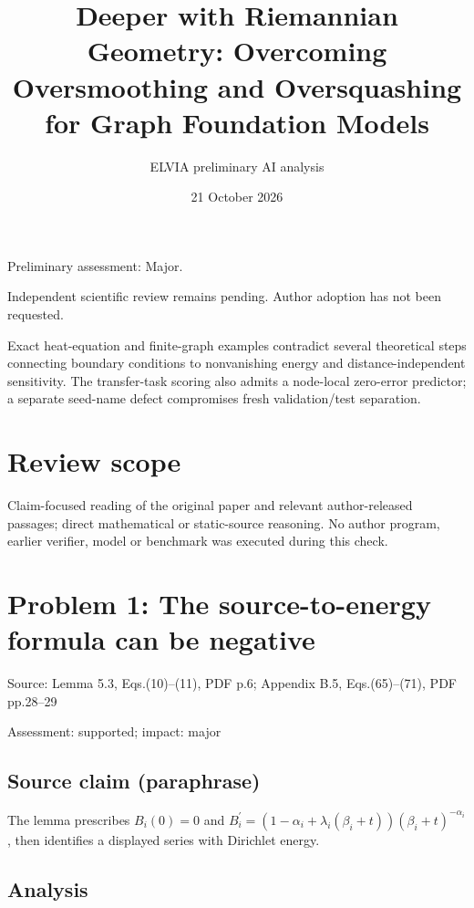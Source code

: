 \documentclass[11pt]{article}
\begin{document}
\title{Deeper with Riemannian Geometry: Overcoming Oversmoothing and Oversquashing for Graph Foundation Models}

\author{ELVIA preliminary AI analysis}\date{21 October 2026}\maketitle

Preliminary assessment: Major.\par

Independent scientific review remains pending. Author adoption has not been requested.

Exact heat-equation and finite-graph examples contradict several theoretical steps connecting boundary conditions to nonvanishing energy and distance-independent sensitivity. The transfer-task scoring also admits a node-local zero-error predictor; a separate seed-name defect compromises fresh validation/test separation.

\section*{Review scope}

Claim-focused reading of the original paper and relevant author-released passages; direct mathematical or static-source reasoning. No author program, earlier verifier, model or benchmark was executed during this check.

\section*{Problem 1: The source-to-energy formula can be negative}

Source: Lemma 5.3, Eqs.(10)–(11), PDF p.6; Appendix B.5, Eqs.(65)–(71), PDF pp.28–29

Assessment: supported; impact: major

\subsection*{Source claim (paraphrase)}

The lemma prescribes \(B_i(0)=0\) and \(B_i^{\prime}=(1-\alpha_i+\lambda_i(\beta_i+t))(\beta_i+t)^{-\alpha_i}\), then identifies a displayed series with Dirichlet energy.

\subsection*{Analysis}
\end{document}
